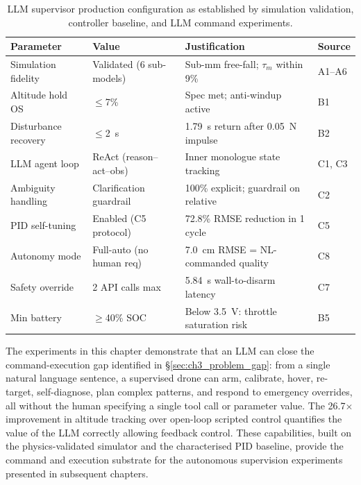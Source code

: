 \begin{table}[ht]
  \caption{LLM supervisor production configuration as established by simulation validation, controller baseline, and LLM command experiments. }
  \label{tab:ch3_production_config}
  \centering
  \small
  \begin{tabular}{llll}
    \toprule
    Parameter & Value & Justification & Source \\
    \midrule
    Simulation fidelity   & Validated (6 sub-models) & Sub-mm free-fall; $\tau_m$ within 9\% & A1--A6 \\
    Altitude hold OS      & $\leq$7\%                & Spec met; anti-windup active          & B1 \\
    Disturbance recovery  & $\leq$2~s                & 1.79~s return after 0.05~N impulse    & B2 \\
    LLM agent loop        & ReAct (reason--act--obs) & Inner monologue state tracking        & C1, C3 \\
    Ambiguity handling    & Clarification guardrail  & 100\% explicit; guardrail on relative & C2 \\
    PID self-tuning       & Enabled (C5 protocol)    & 72.8\% RMSE reduction in 1 cycle     & C5 \\
    Autonomy mode         & Full-auto (no human req) & 7.0~cm RMSE = NL-commanded quality   & C8 \\
    Safety override       & 2 API calls max          & 5.84~s wall-to-disarm latency         & C7 \\
    Min battery           & $\geq$40\% SOC           & Below 3.5~V: throttle saturation risk & B5 \\
    \bottomrule
  \end{tabular}
\end{table}

The experiments in this chapter demonstrate that an LLM can close the command-execution gap identified in \S\ref{sec:ch3_problem_gap}: from a single natural language sentence, a supervised drone can arm, calibrate, hover, re-target, self-diagnose, plan complex patterns, and respond to emergency overrides, all without the human specifying a single tool call
or parameter value. 
The 26.7$\times$ improvement in altitude tracking over
open-loop scripted control quantifies the value of the LLM correctly allowing feedback control. 
These capabilities, built on the physics-validated
simulator and the characterised PID baseline, provide
the command and execution substrate for the autonomous supervision experiments presented in subsequent chapters.
